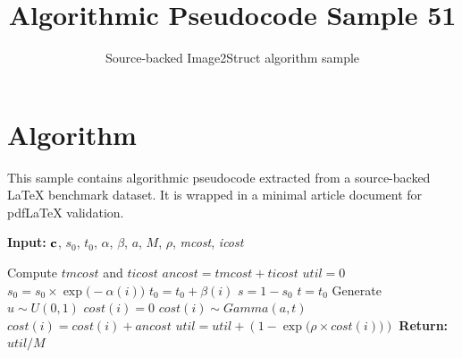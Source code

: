 \documentclass[11pt]{article}
\title{Algorithmic Pseudocode Sample 51}
\author{Source-backed Image2Struct algorithm sample}
\date{}
\begin{document}
\maketitle
\section{Algorithm}
This sample contains algorithmic pseudocode extracted from a source-backed LaTeX benchmark dataset. It is wrapped in a minimal article document for pdfLaTeX validation.

\begin{algorithm}[htbp]
\caption{Source-backed algorithmic procedure}
\begin{algorithm}
[H]
\caption{}
\textbf{Input:} ${\bf c}$, $s_0$, $t_0$, $\alpha$, $\beta$, $a$, $M$,
$\rho$, {\em mcost}, {\em icost}
\begin{algorithmic}[1]
\State Compute $tmcost$ and $ticost$
\State $ancost = tmcost + ticost$
\State $util=0$
\State $s_0 = s_0 \times \exp\big(-\alpha(i)\big)$
\State $t_{0} = t_{0} + \beta(i)$
\EndIf
\EndFor
\State $s = 1 - s_0$
\State $t = t_0$
 \State Generate $u\sim U(0,1)$
\State $cost(i) = 0$
\Else
\State $cost(i)\sim Gamma(a,t)$
\EndIf
\State $cost(i)=cost(i)+ancost$
\State $util=util + (1- \exp\big(\rho \times cost(i)\big) ) $ \EndFor
\State \textbf{Return:} $util/M$
\end{algorithmic}
\end{algorithm}
\end{algorithm}
\end{document}
